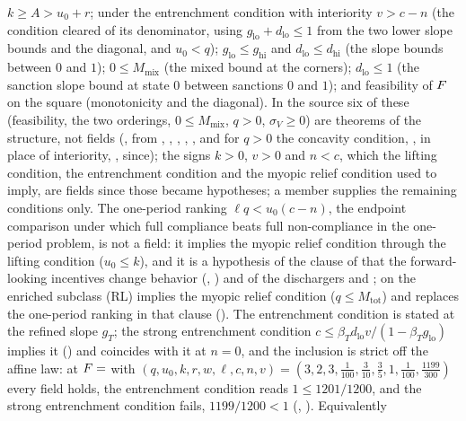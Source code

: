 $k\ge A>u_0+r$;
under the entrenchment condition with interiority $v>c-n$ (the condition cleared of its
denominator, using $g_{\mathrm{lo}}+d_{\mathrm{lo}}\le1$ from the two lower
slope bounds and the diagonal, and $u_0<q$);
$g_{\mathrm{lo}}\le g_{\mathrm{hi}}$ and $d_{\mathrm{lo}}\le d_{\mathrm{hi}}$ (the
slope bounds between $0$ and $1$); $0\le M_{\mathrm{mix}}$ (the mixed bound at the
corners); $d_{\mathrm{lo}}\le1$ (the sanction slope bound at state $0$ between sanctions $0$
and $1$); and feasibility of $F$ on the square (monotonicity and the
diagonal). In the source six of these (feasibility, the two orderings,
$0\le M_{\mathrm{mix}}$, $q>0$, $\sigma_V\ge0$) are theorems of the
structure, not fields (, from
, ,
, ,
, and for $q>0$ the concavity condition,
, in place of interiority, ,
since); the signs $k>0$, $v>0$ and $n<c$, which the lifting condition, the entrenchment
condition and the myopic relief condition used to imply, are fields since those became
hypotheses; a member supplies the remaining conditions only. The one-period ranking $\ell q<u_0(c-n)$, the endpoint comparison under which
full compliance beats full non-compliance in the one-period problem, is not a field: it
implies the myopic relief condition through the lifting condition ($u_0\le k$), and it is a
hypothesis of the clause of  that the forward-looking
incentives change behavior
(, ) and of
the dischargers  and
; on the enriched subclass \textup{(RL)}
implies the myopic relief condition ($q\le M_{\mathrm{tot}}$) and replaces the
one-period ranking in that clause (). The entrenchment
condition is stated at the refined slope $g_T$; the strong entrenchment condition
$c\le\beta_Td_{\mathrm{lo}}v/(1-\beta_Tg_{\mathrm{lo}})$ implies it
() and coincides with it at $n=0$, and the inclusion
is strict off the affine law: at $F=$  with
$(q,u_0,k,r,w,\ell,c,n,v)=(3,2,3,\tfrac1{100},\tfrac3{10},\tfrac35,1,\tfrac1{100},\tfrac{1199}{300})$
every field holds, the entrenchment condition reads $1\le1201/1200$, and the
strong entrenchment condition fails, $1199/1200<1$ (,
). Equivalently
